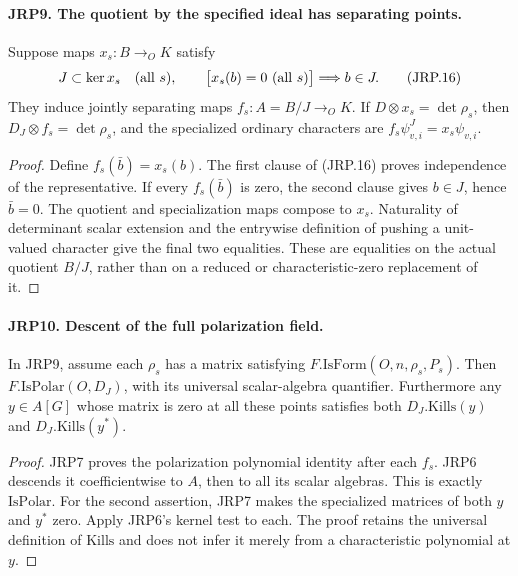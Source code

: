 \paragraph{JRP9. The quotient by the specified ideal has separating points.}
\label{claim:JRP9}
Suppose maps \(x_s:B\to_O K\) satisfy
\[
 J\subset\ker x_s\quad(\hbox{all }s),\qquad
       \bigl[x_s(b)=0\ (\hbox{all }s)\bigr]\Longrightarrow b\in J.
 \tag{JRP.16}
\]
They induce jointly separating maps \(f_s:A=B/J\to_O K\).
If \(D\otimes x_s=\det\rho_s\), then
\(D_J\otimes f_s=\det\rho_s\), and the specialized ordinary
characters are \(f_s\psi^J_{v,i}=x_s\psi_{v,i}\).
\begin{proof}
Define \(f_s(\bar b)=x_s(b)\).  The first clause of
(JRP.16) proves independence of the representative.  If every
\(f_s(\bar b)\) is zero, the second clause gives \(b\in J\),
hence \(\bar b=0\).  The quotient and specialization maps
compose to \(x_s\).  Naturality of determinant scalar extension
and the entrywise definition of pushing a unit-valued character
give the final two equalities.  These are equalities on the actual
quotient \(B/J\), rather than on a reduced or characteristic-zero
replacement of it.
\end{proof}

\paragraph{JRP10. Descent of the full polarization field.}
\label{claim:JRP10}
In JRP9, assume each \(\rho_s\) has a matrix satisfying
\(F.\mathrm{IsForm}(O,n,\rho_s,P_s)\).  Then
\(F.\mathrm{IsPolar}(O,D_J)\), with its universal scalar-algebra
quantifier.  Furthermore any \(y\in A[G]\) whose matrix is zero
at all these points satisfies both
\(D_J.\mathrm{Kills}(y)\) and \(D_J.\mathrm{Kills}(y^*)\).
\begin{proof}
JRP7 proves the polarization polynomial identity after each
\(f_s\).  JRP6 descends it coefficientwise to \(A\), then to
all its scalar algebras.  This is exactly \(\mathrm{IsPolar}\).
For the second assertion, JRP7 makes the specialized matrices of
both \(y\) and \(y^*\) zero.  Apply JRP6's kernel test to each.
The proof retains the universal definition of \(\mathrm{Kills}\)
and does not infer it merely from a characteristic polynomial at
\(y\).
\end{proof}

